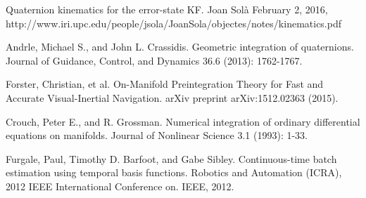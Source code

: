 \documentclass[10pt,a4paper]{article}
\numberwithin{equation}{section}
\begin{document}
\begin{thebibliography}{}

 Quaternion kinematics for the error-state KF. Joan Solà February 2, 2016, http://www.iri.upc.edu/people/jsola/JoanSola/objectes/notes/kinematics.pdf

 Andrle, Michael S., and John L. Crassidis. Geometric integration of quaternions. Journal of Guidance, Control, and Dynamics 36.6 (2013): 1762-1767.

Forster, Christian, et al. On-Manifold Preintegration Theory for Fast and Accurate Visual-Inertial Navigation. arXiv preprint arXiv:1512.02363 (2015).

 Crouch, Peter E., and R. Grossman. Numerical integration of ordinary differential equations on manifolds. Journal of Nonlinear Science 3.1 (1993): 1-33.

 Furgale, Paul, Timothy D. Barfoot, and Gabe Sibley. Continuous-time batch estimation using temporal basis functions. Robotics and Automation (ICRA), 2012 IEEE International Conference on. IEEE, 2012.

\end{thebibliography}
\end{document}

